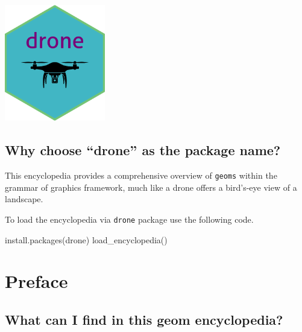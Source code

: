 \documentclass[
  letterpaper,
  DIV=11,
  numbers=noendperiod]{scrreprt}
\newenvironment{Shaded}{\begin{snugshade}}{\end{snugshade}}
\newcommand{\FunctionTok}[1]{\textcolor[rgb]{0.28,0.35,0.67}{#1}}
\newcommand{\NormalTok}[1]{\textcolor[rgb]{0.00,0.23,0.31}{#1}}
\begin{document}

\begin{center}
\includegraphics[width=1.73in,height=\textheight]{dronehex.png}
\end{center}

\section*{Why choose ``drone'' as the package
name?}\label{why-choose-drone-as-the-package-name}


This encyclopedia provides a comprehensive overview of \texttt{geoms}
within the grammar of graphics framework, much like a drone offers a
bird's-eye view of a landscape.

To load the encyclopedia via \texttt{drone} package use the following
code.

\begin{Shaded}
\begin{Highlighting}[]
\FunctionTok{install.packages}\NormalTok{(drone)}
\FunctionTok{load\_encyclopedia}\NormalTok{()}
\end{Highlighting}
\end{Shaded}


\chapter*{Preface}\label{preface}


\section*{\texorpdfstring{What can I find in this {geom
encyclopedia}?}{What can I find in this geom encyclopedia?}}\label{what-can-i-find-in-this-geom-encyclopedia}
\end{document}
